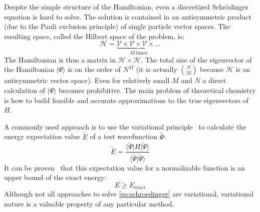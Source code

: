 Despite the simple structure of the Hamiltonian, even a discretized
Schr{\"o}dinger equation is hard to solve. The solution is contained in an 
antisymmetric product (due to the Pauli exclusion 
principle) of single particle vector spaces. The resulting space, called 
the Hilbert space of the problem, is: 
%
\begin{equation}
 \mathcal{H} = \underbrace{\mathcal{V} \times \mathcal{V} \times \mathcal{V} 
\times \ldots}_{M ~\mathrm{times}}
\end{equation}
%
The Hamiltonian is thus a matrix in $\mathcal{H} \times \mathcal{H}$. The total 
size of the eigenvector of the Hamiltonian $|\Psi \rangle$ is 
on the order of $N^{M}$ (it is actually $N \choose M$ because $\mathcal{H}$ is 
an antisymmetric vector space). Even for relatively small $M$ and $N$ a direct 
calculation of $|\Psi \rangle$ becomes prohibitive. The main problem of 
theoretical chemistry is how to build feasible and accurate 
approximations to the true eigenvectors of $H$.

A commonly used approach is to use the variational 
principle~\cite{jensen2017introduction} to 
calculate the energy expectation value $\tilde{E}$ of a test wavefunction 
$\tilde{\Psi}$:
%
\begin{equation}
 \tilde{E} = \frac{\langle \tilde{\Psi} | H | \tilde{\Psi} \rangle}{\langle 
\tilde{\Psi} |\tilde{\Psi} \rangle} 
\end{equation}
%
It can be proven~\cite{levine2000quantum} that this expectation value for a 
normalizable function is an upper bound of the exact energy:
%
\begin{equation}
 E \geq E_{\mathrm{exact}}
\end{equation}
Although not all approaches to solve \ref{eq:schroedinger} are variational, 
variational nature is a valuable property of any particular method. 

